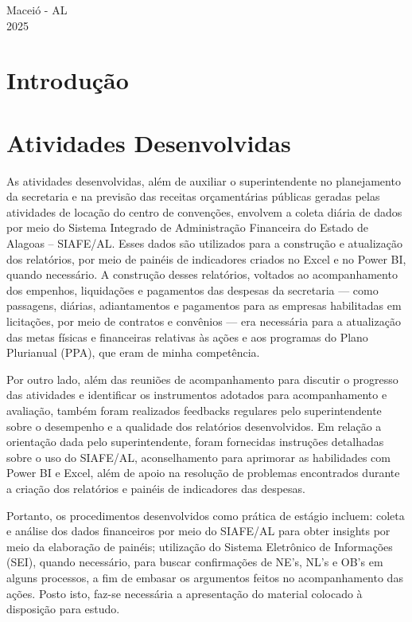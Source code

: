\documentclass[12pt,a4paper]{article}
\begin{document}
	\vfill
	\begin{flushright}
		\centering Maceió - AL \\
		2025
	\end{flushright}
	
	\newpage
	
	\section{Introdução}
	
	\hspace*{1,5cm}
	
	\section{Atividades Desenvolvidas}
	

	\hspace*{1,5cm} As atividades desenvolvidas, além de auxiliar o superintendente no planejamento da secretaria e na previsão das 
 	receitas orçamentárias públicas geradas pelas atividades de locação do centro de convenções, envolvem a coleta diária de dados por meio do Sistema
 	Integrado de Administração Financeira do Estado de Alagoas – SIAFE/AL. Esses dados são utilizados para a construção e atualização dos relatórios, 
	 por meio de painéis de indicadores criados no Excel e no Power BI, quando necessário. A construção desses relatórios, voltados ao acompanhamento dos empenhos, 
 	liquidações e pagamentos das despesas da secretaria — como passagens, diárias, adiantamentos e pagamentos para as empresas habilitadas em licitações, 
 	por meio de contratos e convênios — era necessária para a atualização das metas físicas e financeiras relativas às ações e aos programas do Plano Plurianual (PPA),
 	que eram de minha competência.  

	Por outro lado, além das reuniões de acompanhamento para discutir o progresso das atividades e identificar os instrumentos 
 	adotados para acompanhamento e avaliação, também foram realizados feedbacks regulares pelo superintendente sobre o desempenho e a 
 	qualidade dos relatórios desenvolvidos. Em relação a orientação dada pelo superintendente, foram fornecidas instruções detalhadas sobre o uso do SIAFE/AL, 
 	aconselhamento para aprimorar as habilidades com Power BI e Excel, além de apoio na resolução de problemas encontrados durante a criação dos relatórios e painéis 
	de indicadores das despesas.  
	
	Portanto, os procedimentos desenvolvidos como prática de estágio incluem: coleta e análise dos dados financeiros por meio do SIAFE/AL 
	para obter insights por meio da elaboração de painéis; utilização do Sistema Eletrônico de Informações (SEI), quando necessário, 
 	para buscar confirmações de NE’s, NL’s e OB’s em alguns processos, a fim de embasar os argumentos feitos no acompanhamento das ações.
 	Posto isto, faz-se necessária a apresentação do material colocado à disposição para estudo.
\end{document}
